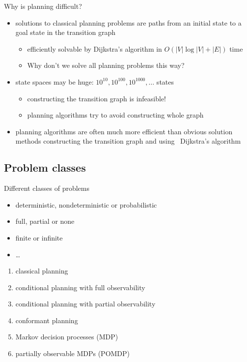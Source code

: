 \documentclass{gkibeamer}
\begin{document}
\begin{frame}{Why is planning difficult?}
  \begin{itemize}
  \item solutions to classical planning problems are \alert{paths from
    an initial state to a goal state} in the \alert{transition graph}
    \begin{itemize}
    \item efficiently solvable by Dijkstra's algorithm in
      $O(|V|\log |V| + |E|)$ time
    \item Why don't we solve all planning problems this way?
    \end{itemize}
  \item state spaces may be \alert{huge}: $10^{10}, 10^{100}, 10^{1000},
    \dots$ states
    \begin{itemize}
    \item constructing the transition graph is infeasible!
    \item planning algorithms try to \alert{avoid constructing whole
      graph}
    \end{itemize}
  \item planning algorithms are often much more efficient than obvious
    solution methods constructing the transition graph and using
    \eg\ Dijkstra's algorithm
  \end{itemize}
\end{frame}

\subsection{Problem classes}

\begin{frame}{Different classes of problems}
  \begin{itemize}
  \item {} \alert<all:2,5>{deterministic},
    \alert<all:3,4,5>{nondeterministic} or
    \alert<all:6,7>{probabilistic}
  \item {} \alert<all:2,3,6>{full},
    \alert<all:4,7>{partial} or \alert<all:5>{none}
  \item {} \alert<all:2,3,4,5,6,7>{finite} or
    \alert<all:3,4,6,7>{infinite}
  \item \dots
  \end{itemize}

  \begin{enumerate}
  \item \alert<all:2>{classical planning}
  \item \alert<all:3>{conditional planning with full observability}
  \item \alert<all:4>{conditional planning with partial observability}
  \item \alert<all:5>{conformant planning}
  \item \alert<all:6>{Markov decision processes (MDP)}
  \item \alert<all:7>{partially observable MDPs (POMDP)}
  \end{enumerate}
\end{frame}
\end{document}
